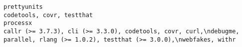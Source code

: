 \documentclass[
  letterpaper,
  DIV=11,
  numbers=noendperiod]{scrreprt}
\begin{document}
\begin{verbatim}
prettyunits                                                                                                                                                                                                                                                                                                                                                                                                                                                                                                                                                                                                                                                                                                                                                                                                                                                                                                                                                                                                                                                                                                                                                                                                                                                                         codetools, covr, testthat
processx                                                                                                                                                                                                                                                                                                                                                                                                                                                                                                                                                                                                                                                                                                                                                                                                                                                                                                                                                                                                                                                                                                                                                                 callr (>= 3.7.3), cli (>= 3.3.0), codetools, covr, curl,\ndebugme, parallel, rlang (>= 1.0.2), testthat (>= 3.0.0),\nwebfakes, withr

\end{verbatim}
\end{document}

